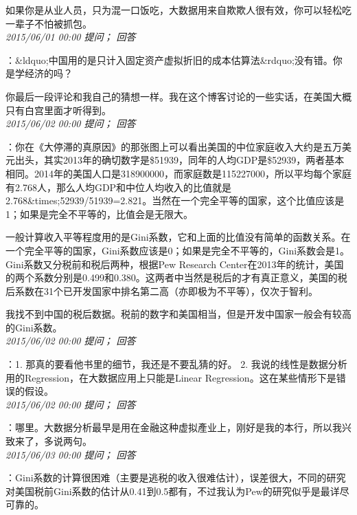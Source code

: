 \documentclass[twocolumn]{ctexart}
\begin{document}
如果你是从业人员，只为混一口饭吃，大数据用来自欺欺人很有效，你可以轻松吃一辈子不怕被抓包。\\

\textit{\hfill\noindent\small 2015/06/01 00:00 提问； 回答}

：\&ldquo;中国用的是只计入固定资产虚拟折旧的成本估算法\&rdquo;没有错。你是学经济的吗？

你最后一段评论和我自己的猜想一样。我在这个博客讨论的一些实话，在美国大概只有白宫里面才听得到。\\

\textit{\hfill\noindent\small 2015/06/02 00:00 提问； 回答}

：你在《大停滞的真原因》的那张图上可以看出美国的中位家庭收入大约是五万美元出头，其实2013年的确切数字是\$51939，同年的人均GDP是\$52939，两者基本相同。2014年的美国人口是318900000，而家庭数是115227000，所以平均每个家庭有2.768人，那么人均GDP和中位人均收入的比值就是2.768\&times;52939/51939=2.821。当然在一个完全平等的国家，这个比值应该是1；如果是完全不平等的，比值会是无限大。

一般计算收入平等程度用的是Gini系数，它和上面的比值没有简单的函数关系。在一个完全平等的国家，Gini系数应该是0；如果是完全不平等的，Gini系数会是1。Gini系数又分税前和税后两种，根据Pew Research Center在2013年的统计，美国的两个系数分别是0.499和0.380。这两者中当然是税后的才有真正意义，美国的税后系数在31个已开发国家中排名第二高（亦即极为不平等），仅次于智利。

我找不到中国的税后数据。税前的数字和美国相当，但是开发中国家一般会有较高的Gini系数。\\

\textit{\hfill\noindent\small 2015/06/02 00:00 提问； 回答}

：1. 那真的要看他书里的细节，我还是不要乱猜的好。
2. 我说的线性是数据分析用的Regression，在大数据应用上只能是Linear Regression。这在某些情形下是错误的假设。\\

\textit{\hfill\noindent\small 2015/06/02 00:00 提问； 回答}

：哪里。大数据分析最早是用在金融这种虚拟產业上，刚好是我的本行，所以我兴致来了，多说两句。\\

\textit{\hfill\noindent\small 2015/06/03 00:00 提问； 回答}

：Gini系数的计算很困难（主要是逃税的收入很难估计），误差很大，不同的研究对美国税前Gini系数的估计从0.41到0.5都有，不过我认为Pew的研究似乎是最详尽可靠的。
\end{document}
